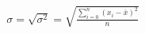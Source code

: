 \documentclass[10pt]{article}
\begin{document}
\begin{align*}\sigma = \sqrt{\sigma^2} = \sqrt{\frac{\sum\limits_{i=0}^n (x_i - \bar{x})^2}{n}}\end{align*}
\end{document}
